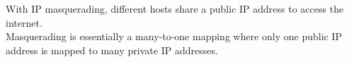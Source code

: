 With IP masquerading, different hosts share a public IP address to access the internet. \\
Masquerading is essentially a many-to-one mapping where only one public IP address is mapped to many private IP addresses.
